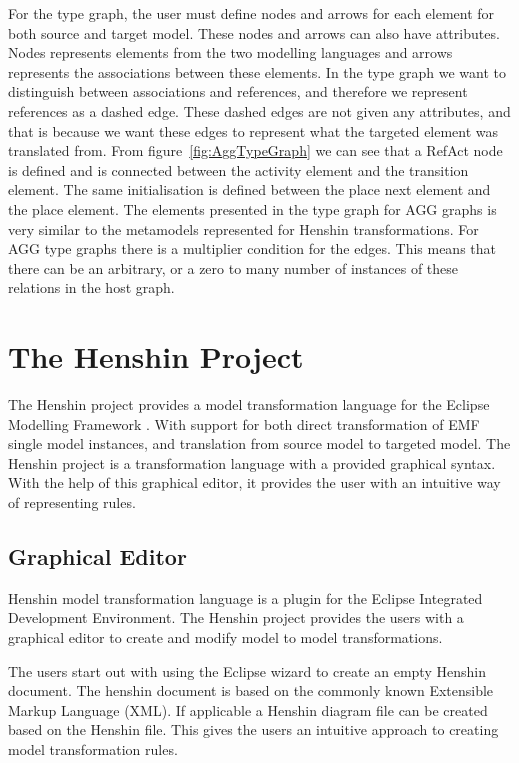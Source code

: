 \documentclass[pdftex,11pt,a4paper]{article}
\begin{document}
\indent For the type graph, the user must define nodes and arrows for each
element for both source and target model. These nodes and arrows can also have
attributes. Nodes represents elements from the two modelling languages and
arrows represents the associations between these elements. In the type graph we
want to distinguish between associations and references, and therefore we
represent references as a dashed edge. These dashed edges are not given any
attributes, and that is because we want these edges to represent what the
targeted element was translated from. From figure~\ref{fig:AggTypeGraph} we can
see that a RefAct node is defined and is connected between the activity
element and the transition element. The same initialisation is defined between
the place next element and the place element. The elements presented in the
type graph for AGG graphs is very similar to the metamodels represented for
Henshin transformations. For AGG type graphs there is a multiplier condition for
the edges. This means that there can be an arbitrary, or a zero to many number of
instances of these relations in the host graph.

\section{The Henshin Project}

\noindent The Henshin project\cite{Henshin} provides a model transformation
language for the Eclipse Modelling Framework \cite{Steinberg2009}. With support for both direct 
transformation of EMF single model instances, and translation from source
model to targeted model. The Henshin project is a transformation language with a
provided graphical syntax. With the help of this graphical editor, it provides
the user with an intuitive way of representing rules. 

\subsection{Graphical Editor}
\noindent Henshin model transformation language is a plugin for the Eclipse
Integrated Development Environment\cite{Eclipse}. The Henshin project provides
the users with a graphical editor to create and modify model to model
transformations. 

The users start out with using the Eclipse wizard to create an empty Henshin
document. The henshin document is based on the commonly known Extensible Markup
Language (XML)\cite{XML}. If applicable a Henshin diagram file can be created
based on the Henshin file. This gives the users an intuitive approach to
creating model transformation rules.
\end{document}

